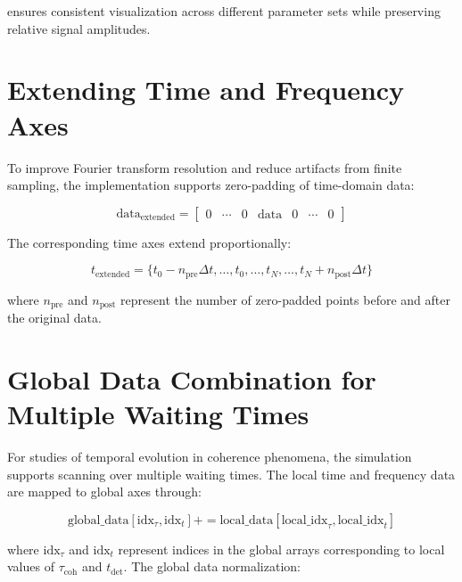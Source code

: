 \noindent
ensures consistent visualization across different parameter sets while preserving relative signal amplitudes.

\section{Extending Time and Frequency Axes}
\label{sec:extending_axes}

\noindent
To improve Fourier transform resolution and reduce artifacts from finite sampling, the implementation supports zero-padding of time-domain data:

\begin{equation}
    \label{eq:zero_padding_matrix}
    \text{data}_{\text{extended}} = \begin{bmatrix}
        0 & \cdots & 0 & \text{data} & 0 & \cdots & 0
    \end{bmatrix}
\end{equation}

\noindent
The corresponding time axes extend proportionally:

\begin{equation}
    \label{eq:extended_time_axis}
    t_{\text{extended}} = \{t_0 - n_{\text{pre}} \Delta t, \ldots, t_0, \ldots, t_N, \ldots, t_N + n_{\text{post}} \Delta t\}
\end{equation}

\noindent
where $n_{\text{pre}}$ and $n_{\text{post}}$ represent the number of zero-padded points before and after the original data.

\section{Global Data Combination for Multiple Waiting Times}
\label{sec:global_data_combination}

\noindent
For studies of temporal evolution in coherence phenomena, the simulation supports scanning over multiple waiting times. The local time and frequency data are mapped to global axes through:

\begin{equation}
    \label{eq:global_mapping_corrected}
    \text{global\_data}[\text{idx}_\tau, \text{idx}_t] += \text{local\_data}[\text{local\_idx}_\tau, \text{local\_idx}_t]
\end{equation}

\noindent
where $\text{idx}_\tau$ and $\text{idx}_t$ represent indices in the global arrays corresponding to local values of $\tau_{\text{coh}}$ and $t_{\text{det}}$. The global data normalization:

